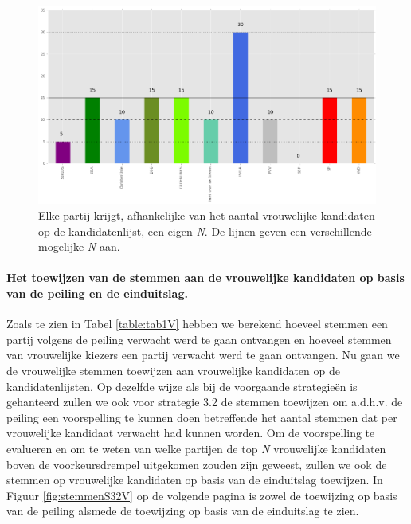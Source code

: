 \begin{figure}[H]

	\includegraphics[width=\linewidth]{eigenX_partijen.png}

			\caption{Elke partij krijgt, afhankelijke van het aantal vrouwelijke kandidaten op de kandidatenlijst, een eigen \textit{N}. De lijnen geven een verschillende mogelijke \textit{N} aan.}

\label{fig:XV}
\end{figure}

\paragraph{Het toewijzen van de stemmen aan de vrouwelijke kandidaten op basis van de peiling en de einduitslag.}
Zoals te zien in Tabel \ref{table:tab1V} hebben we berekend hoeveel stemmen een partij volgens de peiling verwacht werd te gaan ontvangen en hoeveel stemmen van vrouwelijke kiezers een partij verwacht werd te gaan ontvangen. Nu gaan we de vrouwelijke stemmen toewijzen aan vrouwelijke kandidaten op de kandidatenlijsten. Op dezelfde wijze als bij de voorgaande strategie\"{e}n is gehanteerd zullen we ook voor strategie 3.2 de stemmen toewijzen om a.d.h.v. de peiling een voorspelling te kunnen doen betreffende het aantal stemmen dat per vrouwelijke kandidaat verwacht had kunnen worden. Om de voorspelling te evalueren en om te weten van welke partijen de top \textit{N} vrouwelijke kandidaten boven de voorkeursdrempel uitgekomen zouden zijn geweest, zullen we ook de stemmen op vrouwelijke kandidaten op basis van de einduitslag toewijzen. In Figuur \ref{fig:stemmenS32V} op de volgende pagina is zowel de toewijzing op basis van de peiling alsmede de toewijzing op basis van de einduitslag te zien.  




